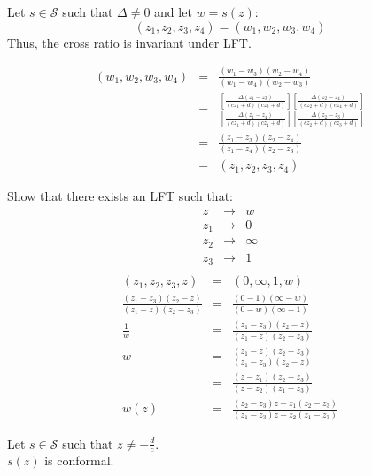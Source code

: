 \documentclass[letterpaper,12pt,fleqn]{article}
\newcommand{\D}{\Delta}
\renewcommand{\S}{\mathcal{S}}
\begin{document}
\begin{theorem}
  Let $s\in\S$ such that $\D\ne0$ and let $w=s(z)$:
  \[(z_1,z_2,z_3,z_4)=(w_1,w_2,w_3,w_4)\]
  Thus, the cross ratio is invariant under LFT.
\end{theorem}

\begin{theproof}
  \listbreak
  \begin{eqnarray*}
    (w_1,w_2,w_3,w_4) &=& \frac{(w_1-w_3)(w_2-w_4)}{(w_1-w_4)(w_2-w_3)} \\
    &=& \frac{\left[\frac{\D(z_1-z_3)}{(cz_1+d)(cz_3+d)}\right]
      \left[\frac{\D(z_2-z_4)}{(cz_2+d)(cz_4+d)}\right]}
    {\left[\frac{\D(z_1-z_4)}{(cz_1+d)(cz_4+d)}\right]
      \left[\frac{\D(z_2-z_3)}{(cz_2+d)(cz_3+d)}\right]} \\
    &=& \frac{(z_1-z_3)(z_2-z_4)}{(z_1-z_4)(z_2-z_3)} \\
    &=& (z_1,z_2,z_3,z_4)
  \end{eqnarray*}
\end{theproof}

\begin{example}
  Show that there exists an LFT such that:
  \begin{eqnarray*}
    z &\to& w \\
    z_1 &\to& 0 \\
    z_2 &\to& \infty \\
    z_3 &\to& 1 \\
  \end{eqnarray*}
  \begin{eqnarray*}
    (z_1,z_2,z_3,z) &=& (0,\infty,1,w) \\
    \frac{(z_1-z_3)(z_2-z)}{(z_1-z)(z_2-z_3)} &=&
    \frac{(0-1)(\infty-w)}{(0-w)(\infty-1)} \\
    \frac{1}{w} &=& \frac{(z_1-z_3)(z_2-z)}{(z_1-z)(z_2-z_3)} \\
    w &=& \frac{(z_1-z)(z_2-z_3)}{(z_1-z_3)(z_2-z)} \\
    &=& \frac{(z-z_1)(z_2-z_3)}{(z-z_2)(z_1-z_3)} \\
    w(z) &=& \frac{(z_2-z_3)z-z_1(z_2-z_3)}{(z_1-z_3)z-z_2(z_1-z_3)}
  \end{eqnarray*}
\end{example}

\begin{theorem}
  Let $s\in\S$ such that $z\ne-\frac{d}{c}$. \\
  $s(z)$ is conformal.
\end{theorem}
\end{document}
